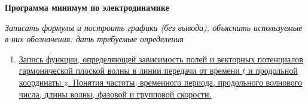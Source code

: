 \documentclass[a4paper,14pt]{extarticle}
\begin{document}
	\begin{center}
		\Large \textbf{Программа минимум по электродинамике}
	\end{center}
		\textit{Записать формулы и построить графики (без вывода), объяснить используемые в них обозначения: дать требуемые определения}
	\begin{enumerate}
		\item 
		\hyperlink{num1}{Запись функции, определяющей зависимость полей и векторных потенциалов гармонической плоской волны в линии передачи от времени $t$ и продольной координаты $z$. Понятия частоты, временного периода, продольного волнового числа, длины волны, фазовой и групповой скорости.}
		

\end{enumerate}
\end{document}
